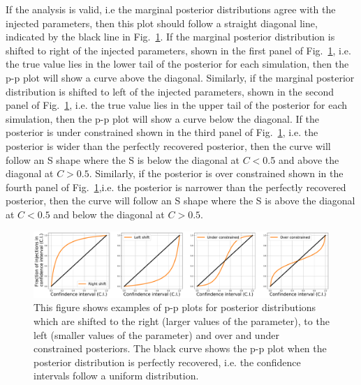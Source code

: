 If the analysis is valid, i.e the marginal posterior distributions agree with the injected parameters, then this plot should follow a straight diagonal line, indicated by the black line in Fig.~\ref{par_est:results:ppplot_example}.
If the marginal posterior distribution is shifted to right of the injected parameters, shown in the first panel of Fig.~\ref{par_est:results:ppplot_example}, i.e. the true value lies in the lower tail of the posterior for each simulation, then the p-p plot will show a curve above the diagonal.
Similarly, if the marginal posterior distribution is shifted to left of the injected parameters, shown in the second panel of Fig.~\ref{par_est:results:ppplot_example}, i.e. the true value lies in the upper tail of the posterior for each simulation, then the p-p plot will show a curve below the diagonal. 
If the posterior is under constrained shown in the third panel of Fig.~\ref{par_est:results:ppplot_example}, i.e. the posterior is wider than the perfectly recovered posterior, then the curve will follow an S shape where the S is below the diagonal at $C < 0$.5 and above the diagonal at $C > 0.5$.
Similarly, if the posterior is over constrained shown in the fourth panel of Fig.~\ref{par_est:results:ppplot_example},i.e. the posterior is narrower than the perfectly recovered posterior, then the curve will follow an S shape where the S is above the diagonal at $C < 0.5$ and below the diagonal at $C> 0.5$.
%
\begin{figure}[ht]
    \centering
    \includegraphics[width=\linewidth]{C5_parameter/ppplot_examples.pdf}
    \caption[p-p plot examples]{This figure shows examples of p-p plots for posterior distributions which are shifted to the right (larger values of the parameter), to the left (smaller values of the parameter) and over and under constrained posteriors. The black curve shows the p-p plot when the posterior distribution is perfectly recovered, i.e. the confidence intervals follow a uniform distribution.}
    \label{par_est:results:ppplot_example}
\end{figure}

